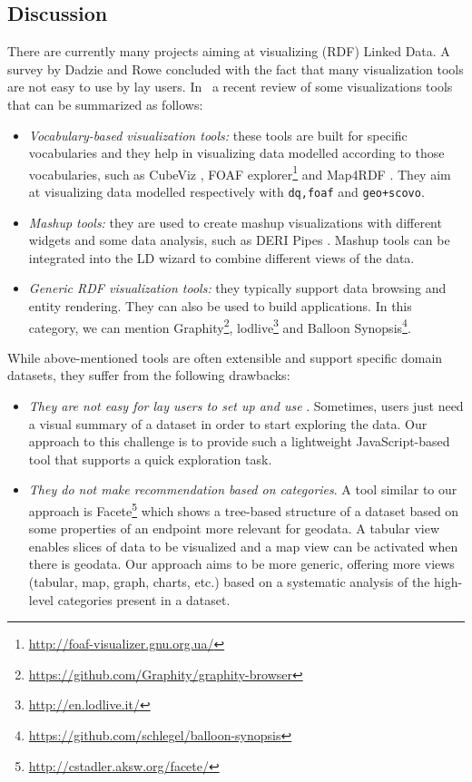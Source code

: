 \subsection{Discussion}
\label{sec:discussion}
There are currently many projects aiming at visualizing (RDF) Linked Data. A survey by Dadzie and Rowe \cite{Dadzie:2011} concluded with the fact that many visualization tools are not easy to use by lay users. In~\cite{Klimek2014} a recent review of some visualizations tools that can be summarized as follows:
\begin{itemize}
 \item \textit{Vocabulary-based visualization tools:} these tools are built for specific vocabularies and they help in visualizing data modelled according to those vocabularies, such as CubeViz \cite{cubeviz:2012}, FOAF explorer\footnote{\url{http://foaf-visualizer.gnu.org.ua/}} and Map4RDF \cite{leon2012}. They aim at visualizing data modelled respectively with \texttt{dq,foaf} and \texttt{geo+scovo}.
 \item \textit{Mashup tools:} they are used to create mashup visualizations with different widgets and some data analysis, such as DERI Pipes \cite{danh2009}. Mashup tools can be integrated into the LD wizard to combine different views of the data.
 \item \textit{Generic RDF visualization tools:} they typically support data browsing and entity rendering. They can also be used to build applications. In this category, we can mention Graphity\footnote{\url{https://github.com/Graphity/graphity-browser}}, lodlive\footnote{\url{http://en.lodlive.it/}} and Balloon Synopsis\footnote{\url{https://github.com/schlegel/balloon-synopsis}}.
\end{itemize}
While above-mentioned tools are often extensible and support specific domain datasets, they suffer from the following drawbacks:
\begin{itemize}
 \item \textit{They are not easy for lay users to set up and use }. Sometimes, users just need a visual summary of a dataset in order to start exploring the data. Our approach to this challenge is to provide such a lightweight JavaScript-based tool that supports a quick exploration task.
 \item \textit{They do not make recommendation based on categories}. A tool similar to our approach is Facete\footnote{\url{http://cstadler.aksw.org/facete/}}\cite{facete:2014} which shows a tree-based structure of a dataset based on some properties of an endpoint more relevant for geodata. A tabular view enables slices of data to be visualized and a map view can be activated when there is geodata. Our approach aims to be more generic, offering more views (tabular, map, graph, charts, etc.) based on a systematic analysis of the high-level categories present in a dataset.
\end{itemize}

